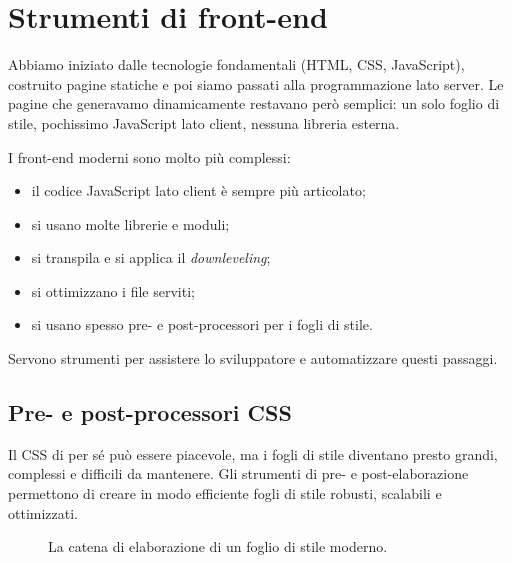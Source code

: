 \chapter{Strumenti di front-end}

Abbiamo iniziato dalle tecnologie fondamentali (HTML, CSS, JavaScript),
costruito pagine statiche e poi siamo passati alla programmazione lato server.
Le pagine che generavamo dinamicamente restavano però semplici: un solo foglio
di stile, pochissimo JavaScript lato client, nessuna libreria esterna.

I front-end moderni sono molto più complessi:

\begin{itemize}
  \item il codice JavaScript lato client è sempre più articolato;
  \item si usano molte librerie e moduli;
  \item si transpila e si applica il \textit{downleveling};
  \item si ottimizzano i file serviti;
  \item si usano spesso pre- e post-processori per i fogli di stile.
\end{itemize}

Servono strumenti per assistere lo sviluppatore e automatizzare questi
passaggi.

\section{Pre- e post-processori CSS}

Il CSS di per sé può essere piacevole, ma i fogli di stile diventano presto
grandi, complessi e difficili da mantenere. Gli strumenti di pre- e
post-elaborazione permettono di creare in modo efficiente fogli di stile
robusti, scalabili e ottimizzati.

\begin{figure}[H]
  \centering
  \caption{La catena di elaborazione di un foglio di stile moderno.}
  \label{fig:css-pipeline}
\end{figure}

